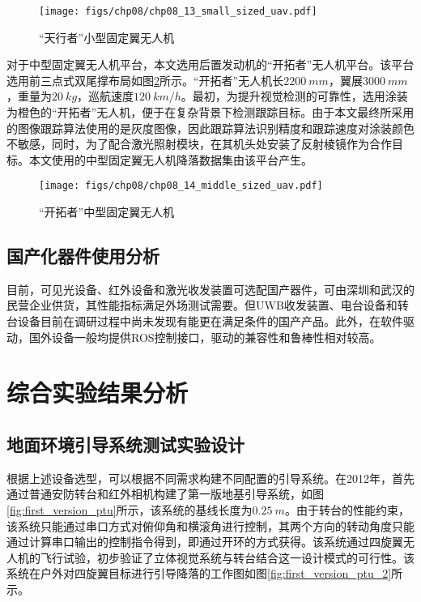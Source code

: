 \begin{figure}[!ht]
	\centering
	\texttt{[image: figs/chp08/chp08\_13\_small\_sized\_uav.pdf]}	
	\caption{“天行者”小型固定翼无人机}
	\label{fig:chp08_13_small_sized_uav}
\end{figure}

对于中型固定翼无人机平台，本文选用后置发动机的“开拓者”无人机平台。该平台选用前三点式双尾撑布局如图\ref{fig:chp08_14_middle_sized_uav}所示。“开拓者”无人机长$2200\ mm$，翼展$3000\ mm$，重量为$20\ kg$，巡航速度$120\ km/h$。最初，为提升视觉检测的可靠性，选用涂装为橙色的“开拓者”无人机，便于在复杂背景下检测跟踪目标。由于本文最终所采用的图像跟踪算法使用的是灰度图像，因此跟踪算法识别精度和跟踪速度对涂装颜色不敏感，同时，为了配合激光照射模块，在其机头处安装了反射棱镜作为合作目标。本文使用的中型固定翼无人机降落数据集由该平台产生。

\begin{figure}[!ht]
	\centering
	\texttt{[image: figs/chp08/chp08\_14\_middle\_sized\_uav.pdf]}	
	\caption{“开拓者”中型固定翼无人机}
	\label{fig:chp08_14_middle_sized_uav}
\end{figure}


\subsection{国产化器件使用分析}
目前，可见光设备、红外设备和激光收发装置可选配国产器件，可由深圳和武汉的民营企业供货，其性能指标满足外场测试需要。但UWB收发装置、电台设备和转台设备目前在调研过程中尚未发现有能更在满足条件的国产产品。此外，在软件驱动，国外设备一般均提供ROS控制接口，驱动的兼容性和鲁棒性相对较高。

\section{综合实验结果分析}
\subsection{地面环境引导系统测试实验设计}
根据上述设备选型，可以根据不同需求构建不同配置的引导系统。在2012年，首先通过普通安防转台和红外相机构建了第一版地基引导系统，如图\ref{fig:first_version_ptu}所示，该系统的基线长度为$0.25\ m$。由于转台的性能约束，该系统只能通过串口方式对俯仰角和横滚角进行控制，其两个方向的转动角度只能通过计算串口输出的控制指令得到，即通过开环的方式获得。该系统通过四旋翼无人机的飞行试验，初步验证了立体视觉系统与转台结合这一设计模式的可行性。该系统在户外对四旋翼目标进行引导降落的工作图如图\ref{fig:first_version_ptu_2}所示。

